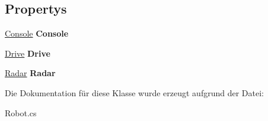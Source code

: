 \subsection*{Propertys}
\begin{DoxyCompactItemize}
\item 
\hypertarget{class_robot_ctrl_1_1_robot_ae78d1691cc943383977741712962bf82}{
\hyperlink{class_robot_ctrl_1_1_console}{Console} {\bfseries Console}}
\label{class_robot_ctrl_1_1_robot_ae78d1691cc943383977741712962bf82}

\item 
\hypertarget{class_robot_ctrl_1_1_robot_a6e1e59f43f8578d78da6c6a19e55f269}{
\hyperlink{class_robot_ctrl_1_1_drive}{Drive} {\bfseries Drive}}
\label{class_robot_ctrl_1_1_robot_a6e1e59f43f8578d78da6c6a19e55f269}

\item 
\hypertarget{class_robot_ctrl_1_1_robot_adcc563b2531e72dcdfb9af5cafda1cbc}{
\hyperlink{class_robot_ctrl_1_1_radar}{Radar} {\bfseries Radar}}
\label{class_robot_ctrl_1_1_robot_adcc563b2531e72dcdfb9af5cafda1cbc}

\end{DoxyCompactItemize}


Die Dokumentation für diese Klasse wurde erzeugt aufgrund der Datei:\begin{DoxyCompactItemize}
\item 
Robot.cs\end{DoxyCompactItemize}
